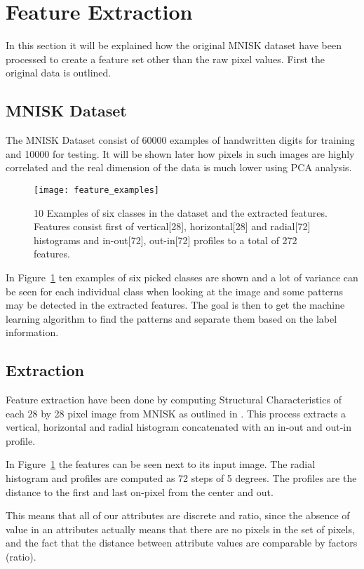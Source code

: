 \section{Feature Extraction}
In this section it will be explained how the original MNISK dataset have been processed to create a feature set other than the raw pixel values. First the original data is outlined.
\subsection{MNISK Dataset}
The MNISK Dataset consist of 60000 examples of handwritten digits for training and 10000 for testing. It will be shown later how pixels in such images are highly correlated and the real dimension of the data is much lower using PCA analysis.


\begin{figure}[hbtp]
\centering
\texttt{[image: feature\_examples]}
\caption{10 Examples of six classes in the dataset and the extracted features. Features consist first of vertical[28], horizontal[28] and radial[72] histograms and in-out[72], out-in[72] profiles to a total of 272 features. \label{fig:image_examples}}
\end{figure}

In Figure~\ref{fig:image_examples} ten examples of six picked classes are shown and a lot of variance can be seen for each individual class when looking at the image and some patterns may be detected in the extracted features. The goal is then to get the machine learning algorithm to find the patterns and separate them based on the label information.
\subsection{Extraction}
Feature extraction have been done by computing Structural Characteristics of each 28 by 28 pixel image from MNISK as outlined in \cite{1227727}. This process extracts a vertical, horizontal and radial histogram concatenated with an in-out and out-in profile.

In Figure~\ref{fig:image_examples} the features can be seen next to its input image. The radial histogram and profiles are computed as 72 steps of 5 degrees. The profiles are the distance to the first and last on-pixel from the center and out. 

This means that all of our attributes are discrete and ratio, since the absence of value in an attributes actually means that there are no pixels in the set of pixels, and the fact that the distance between attribute values are comparable by factors (ratio).
